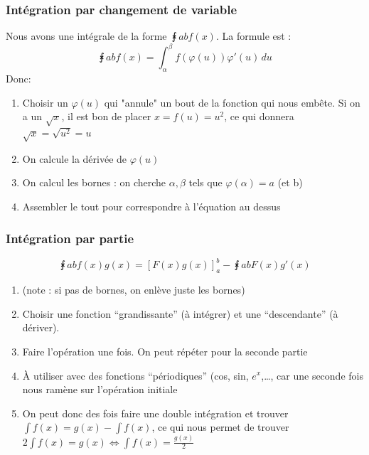 \documentclass[12pt,a4paper]{article}
\renewcommand{\)}{\right)}
\renewcommand{\(}{\left(}
\begin{document}
\subsubsection{Intégration par changement de variable}
Nous avons une intégrale de la forme $\intx{a}{b}{f(x)}$. La formule est :
\begin{equation*}
	\intx{a}{b}{f(x)} = \int_\alpha^\beta f(\varphi(u)) \varphi'(u) \, du
\end{equation*}
Donc:
\begin{enumerate}
	\item Choisir un $\varphi(u)$ qui "annule" un bout de la fonction qui nous embête. Si on a un $\sqrt{x}$, il est bon de placer $x = f(u) = u^2$, ce qui donnera $\sqrt{x} = \sqrt{u^2} = u$
	\item On calcule la dérivée de $\varphi(u)$
	\item On calcul les bornes : on cherche $\alpha, \beta$ tels que $\varphi(\alpha) = a$ (et b)
	\item Assembler le tout pour correspondre à l'équation au dessus
\end{enumerate}
\subsubsection{Intégration par partie}
\begin{equation*}
	\intx{a}{b}{f(x)g(x)} = [F(x)g(x)]_a^b - \intx{a}{b}{F(x)g'(x)}
\end{equation*}
\begin{enumerate}
	\item (note : si pas de bornes, on enlève juste les bornes)
	\item Choisir une fonction \enquote{grandissante} (à intégrer) et une \enquote{descendante} (à dériver).
	\item Faire l'opération une fois. On peut répéter pour la seconde partie
	\item À utiliser avec des fonctions \enquote{périodiques} (cos, sin, $e^x$,\ldots, car une seconde fois nous ramène sur l'opération initiale
	\item On peut donc des fois faire une double intégration et trouver $\int f(x) = g(x) - \int f(x)$, ce qui nous permet de trouver $2\int f(x) = g(x) \iff \int f(x) = \frac{g(x)}{2}$
\end{enumerate}
\end{document}
